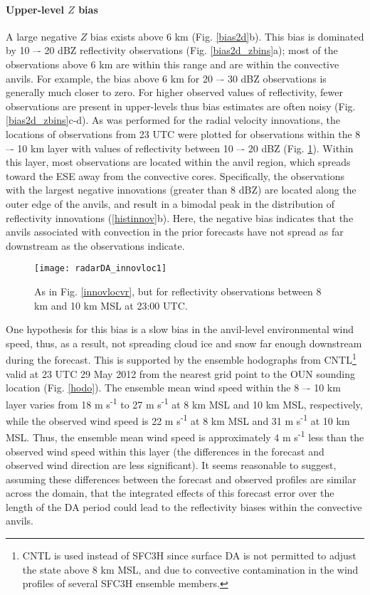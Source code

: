 \paragraph{Upper-level \(Z\) bias}
A large negative \(Z\) bias exists above 6 km (Fig. \ref{bias2d}b). This bias is dominated by 10 –- 20 dBZ reflectivity observations (Fig. \ref{bias2d_zbins}a); most of the observations above 6 km are within this range and are within the convective anvils. For example, the bias above 6 km for 20 –- 30 dBZ observations is generally much closer to zero. For higher observed values of reflectivity, fewer observations are present in upper-levels thus bias estimates are often noisy (Fig. \ref{bias2d_zbins}c-d). As was performed for the radial velocity innovations, the locations of observations from 23 UTC were plotted for observations within the 8 –- 10 km layer with values of reflectivity between 10 –- 20 dBZ (Fig. \ref{vrinnov}). Within this layer, most observations are located within the anvil region, which spreads toward the ESE away from the convective cores. Specifically, the observations with the largest negative innovations (greater than 8 dBZ) are located along the outer edge of the anvils, and result in a bimodal peak in the distribution of reflectivity innovations (\ref{histinnov}b). Here, the negative bias indicates that the anvils associated with convection in the prior forecasts have not spread as far downstream as the observations indicate.

\begin{figure}
\centering
\texttt{[image: radarDA\_innovloc1]}
\caption{As in Fig. \ref{innovlocvr}, but for reflectivity observations between 8 km and 10 km MSL at 23:00 UTC.}
\label{vrinnov}
\end{figure}

One hypothesis for this bias is a slow bias in the anvil-level environmental wind speed, thus, as a result, not spreading cloud ice and snow far enough downstream during the forecast. This is supported by the ensemble hodographs from CNTL\footnote{CNTL is used instead of SFC3H since surface DA is not permitted to adjust the state above 8 km MSL, and due to convective contamination in the wind profiles of several SFC3H ensemble members.} valid at 23 UTC 29 May 2012 from the nearest grid point to the OUN sounding location (Fig. \ref{hodo}). The ensemble mean wind speed within the 8 –- 10 km layer varies from 18 m s\textsuperscript{-1} to 27 m s\textsuperscript{-1} at 8 km MSL and 10 km MSL, respectively, while the observed wind speed is 22 m s\textsuperscript{-1} at 8 km MSL and 31 m s\textsuperscript{-1} at 10 km MSL. Thus, the ensemble mean wind speed is approximately 4 m s\textsuperscript{-1} less than the observed wind speed within this layer (the differences in the forecast and observed wind direction are less significant). It seems reasonable to suggest, assuming these differences between the forecast and observed profiles are similar across the domain, that the integrated effects of this forecast error over the length of the DA period could lead to the reflectivity biases within the convective anvils.

